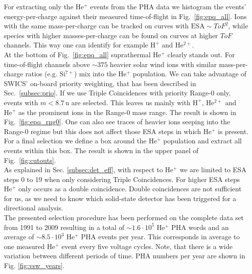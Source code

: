 For extracting only the $\mathrm{He^{+}}$ events from the PHA data we histogram the events' energy-per-charge against their measured time-of-flight in Fig.~\ref{fig:epq_all}. 
Ions with the same mass-per-charge can be tracked on curves with $\mathrm{ESA} \sim ToF^2$, while species with higher masses-per-charge can be found on curves at higher $ToF$ channels. This way one can identify for example $\mathrm{H^{+}}$ and $\mathrm{He^{2+}}$. \\
At the bottom of Fig.~\ref{fig:epq_all} suprathermal $\mathrm{He^{+}}$ clearly stands out. For time-of-flight channels above $\sim 375$ heavier solar wind ions with similar mass-per-charge ratios (e.g. $\mathrm{Si^{7+}}$) mix into the $\mathrm{He^{+}}$ population.
We can take advantage of SWICS' on-board priority weighting, that has been described in Sec.~\ref{subsec:prio}. If we use Triple Coincidences with priority Range-0 only, events with $m<8.7\,\mathrm{u}$ are selected. This leaves us mainly with $\mathrm{H^+}$, $\mathrm{He^{2+}}$ and $\mathrm{He^{+}}$ as the prominent ions in the Range-0 mass range. The result is shown in Fig.~\ref{fig:epq_rng0}. One can also see traces of heavier ions seeping into the Range-0 regime but this does not affect those ESA steps in which $\mathrm{He^{+}}$ is present.
For a final selection we define a box around the $\mathrm{He^{+}}$ population and extract all events within this box. The result is shown in the upper panel of Fig.~\ref{fig:cutouts}.
\\
As explained in Sec. \ref{subsec:det_eff}, with respect to $\mathrm{He^{+}}$ we are limited to ESA steps 0 to 19 when only considering Triple Coincidences. For higher ESA steps $\mathrm{He^{+}}$ only occurs as a double coincidence. Double coincidences are not sufficient for us, as we need to know which solid-state detector has been triggered for a directional analysis.
\\
The presented selection procedure has been performed on the complete data set from 1991 to 2009 resulting in a total of $\sim 1.6\cdot10^{5}$ $\mathrm{He^{+}}$ PHA words and an average of $\sim 8.5\cdot10^{3}$ $\mathrm{He^{+}}$ PHA events per year. This corresponds in average to one measured $\mathrm{He^{+}}$ event every five voltage cycles. Note, that there is a wide variation between different periods of time. PHA numbers per year are shown in Fig. \ref{fig:vsw_years}.
%
%
%
